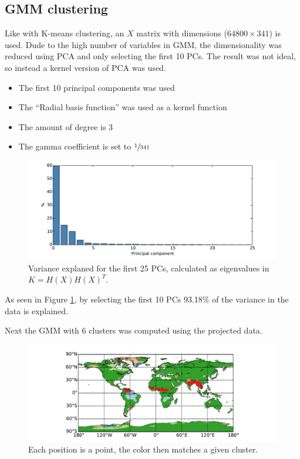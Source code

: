 \subsection{GMM clustering}
Like with K-means clustering, an $X$ matrix with dimensions ($64800 \times 341$) is used. Dude to the high number of variables in GMM, the dimensionality was reduced using PCA and only selecting the first 10 PCs.
The result was not ideal, so instead a kernel version of PCA was used.

\begin{itemize}
\item The first 10 principal components was used
\item The ``Radial basis function'' was used as a kernel function
\item The amount of degree is 3
\item The gamma coefficient is set to $\sfrac{1}{341}$
\end{itemize}

\begin{figure}[H]
	\center
	\includegraphics[width=\textwidth]{figures/gmm-pca-explaned}
	\caption{Variance explaned for the first 25 PCs, calculated as eigenvalues in $K = H(X) H(X)^T$.}
	\label{fig:gmm-pca-explaned}
\end{figure}

As seen in Figure \ref{fig:gmm-pca-explaned}, by selecting the first 10 PCs 93.18\% of the variance in the data is explained.

Next the GMM with 6 clusters was computed using the projected data. 
\begin{figure}[H]
	\center
	\includegraphics[width=\textwidth]{figures/gmm-world}
	\caption{Each position is a point, the color then matches a given cluster.}
\end{figure}

